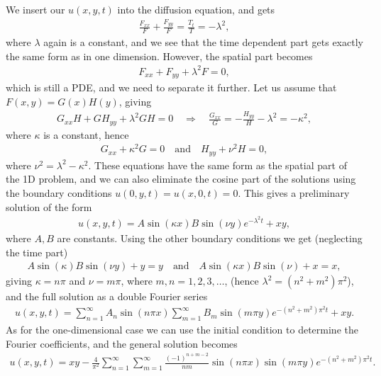 \documentclass[12pt, a4paper]{article}
\begin{document}
We insert our $u(x,y,t)$ into the diffusion equation, and gets 
\begin{align*}
\frac{F_{xx}}{F} + \frac{F_{yy}}{F} = \frac{T_t}{T} = -\lambda^2, 
\end{align*}
where $\lambda$ again is a constant, and we see that the time dependent part gets exactly the same 
form as in one dimension. However, the spatial part becomes
\begin{align*}
F_{xx} + F_{yy} + \lambda^2 F = 0, 
\end{align*}
which is still a PDE, and we need to separate it further. Let us assume that $F(x,y) = G(x)H(y)$, giving 
\begin{align*}
G_{xx} H + G H_{yy} + \lambda^2 GH = 0 \quad \Rightarrow \quad 
\frac{G_{xx}}{G} = -  \frac{H_{yy}}{H} - \lambda^2  = -\kappa^2,  
\end{align*}
where $\kappa$ is a constant, hence 
\begin{align*}
G_{xx} + \kappa^2 G = 0 \quad \text{and} \quad H_{yy} + \nu^2 H = 0, 
\end{align*}
where $\nu^2 = \lambda^2 - \kappa^2$. These equations have the same form as the spatial part of the 1D 
problem, and we can also eliminate the cosine part of the solutions using the boundary conditions 
$u(0,y,t) = u(x,0,t) = 0$. This gives a preliminary solution of the form 
\begin{align*}
u(x,y,t) = A \sin(\kappa x) B \sin (\nu y ) e^{-\lambda^2 t} + xy,  
\end{align*}  
where $A,B$ are constants. Using the other boundary conditions we get (neglecting the time part) 
\begin{align*}
A \sin(\kappa)B\sin(\nu y) + y = y \quad \text{and} \quad A \sin(\kappa x)B\sin(\nu ) + x = x, 
\end{align*}
giving $\kappa = n \pi$ and $\nu = m\pi$, where $m,n=1,2,3,\dots$, (hence $\lambda^2 = (n^2 + m^2)\pi^2$), 
and the full solution as a double Fourier series 
\begin{align*}
u(x,y,t) = \sum_{n=1}^\infty A_n \sin(n\pi x) \sum_{m=1}^\infty B_m \sin(m\pi y) e^{-(n^2 +m^2)\pi^2 t}+xy.  
\end{align*} 
As for the one-dimensional case we can use the initial condition to determine the Fourier coefficients, 
and the general solution becomes 
\begin{align*}
u(x,y,t) = xy - \frac{4}{\pi^2} \sum_{n=1}^\infty \sum_{m=1}^\infty 
							 	\frac{(-1)^{n+m-2}}{nm} \sin(n\pi x)  \sin(m\pi y) e^{-(n^2 +m^2)\pi^2 t}.
\end{align*} 
\end{document}
